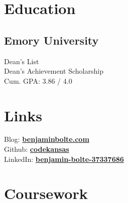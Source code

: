 \documentclass[letterpaper]{deedy-resume} %
\begin{document}
\begin{minipage}[t]{0.33\textwidth} %


\section{Education} 

\subsection{Emory University}

\sectionspace %

Dean's List \\
Dean's Achievement Scholarship\\
Cum. GPA: 3.86 / 4.0 \\

\vspace{2mm}


\sectionspace %


\section{Links} 

Blog: \href{https://benjaminbolte.com}{\bf benjaminbolte.com} \\
Github: \href{https://github.com/codekansas}{\bf codekansas} \\
LinkedIn: \href{https://www.linkedin.com/in/benjamin-bolte-37337686}{\bf benjamin-bolte-37337686} \\

\sectionspace %


\section{Coursework}


\end{minipage}
\end{document}

